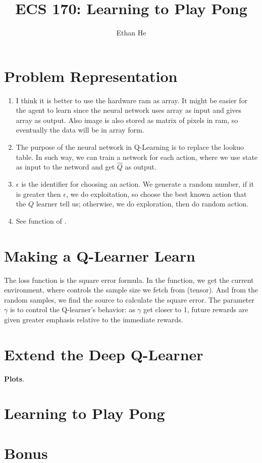 \documentclass[12pt]{article}
\title{ECS 170: Learning to Play Pong}
\author{Ethan He}
\date{\vspace{-1cm}}
\newcommand{\1}{\mathds{1}}
\newcommand{\<}{\langle}
\renewcommand{\>}{\rangle}
\begin{document}
\maketitle

\section{Problem Representation}

\begin{enumerate}
    \item I think it is better to use the hardware ram as array.
        It might be easier for the agent to learn since the neural network
        uses array as input and gives array as output.
        Also image is also stored as matrix of pixels in ram,
        so eventually the data will be in array form.

    \item The purpose of the neural network in Q-Learning is to replace the lookuo table.
        In such way, we can train a network for each action,
        where we use state as input to the netword and get $\widehat{Q}$ as output.

    \item $\epsilon$ is the identifier for choosing an action.
        We generate a random number,
        if it is greater then $\epsilon$,
        we do exploitation, so choose the best known action that the $Q$ learner tell us;
        otherwise, we do exploration, then do random action.

    \item See function  of .
\end{enumerate}



\section{Making a Q-Learner Learn}

The loss function is the square error formula.
In the function, we get the current environment,
where  controls the sample size we fetch from  (tensor).
And from the random samples, we find the source to calculate the square error.
The parameter $\gamma$ is to control the Q-learner's behavior:
as $\gamma$ get closer to 1,
future rewards are given greater emphasis relative to the immediate rewards.


\section{Extend the Deep Q-Learner}

\textbf{Plots}.


\section{Learning to Play Pong}



\section{Bonus}
\end{document}
